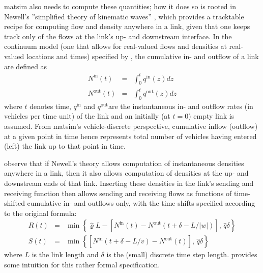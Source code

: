 \gls{matsim} also needs to compute these quantities; how it
does so is rooted in Newell's {}''simplified theory of kinematic
waves'' \citep{newell-1993}, which provides a tracktable recipe for
computing flow and density anywhere in a link, given
that one keeps track only of the flows at the link's up- and
downstream interface. In the continuum model (\ie one that
allows for real-valued flows and densities at real-valued locations
and times) specified by \citet{newell-1993}, the cumulative in- and
outflow of a link are defined as
\begin{eqnarray}
N^{\text{in}}(t) & = & \int_{0}^{t}q^{\text{in}}(z)dz\label{eq:cum-in}\\
N^{\text{out}}(t) & = & \int_{0}^{t}q^{\text{out}}(z)dz\label{eq:cum-out}
\end{eqnarray}
where $t$ denotes time, $q^{\text{in}}$ and $q^{\text{out}}$are
the instantaneous in- and outflow rates (in vehicles per time unit)
of the link and an initially (at $t=0$) empty link is assumed. From
\gls{matsim}'s vehicle-discrete perspective, cumulative inflow (outflow)
at a given point in time hence represents  total number of vehicles
having entered (left) the link up to that point in time.

\citet{yperman-2006,yperman-phd} observe that if Newell's theory
allows computation of instantaneous densities anywhere in a link, then
it also allows computation of densities at the up- and downstream ends
of that link. Inserting these densities in the link's sending and
receiving function then allows  sending and
receiving flows as functions of time-shifted cumulative in- and outflows only, with
the time-shifts specified according to the original
\citet{newell-1993} formula:
\begin{eqnarray}
R(t) & = & \min\left\{ \hat{\varrho}L-\left[N^{\text{in}}(t)-N^{\text{out}}(t+\delta-L/|w|)\right],\,\hat{q}\delta\right\} \label{eq:R-yperman}\\
S(t) & = & \min\left\{ \left[N^{\text{in}}(t+\delta-L/v)-N^{\text{out}}(t)\right],\,\hat{q}\delta\right\}\label{eq:S-yperman}
\end{eqnarray}\corr{,}{}
where $L$ is the link length and $\delta$ is the (small)
discrete time step length. \citet{yperman-phd} provides some 
intuition for this rather formal specification.

